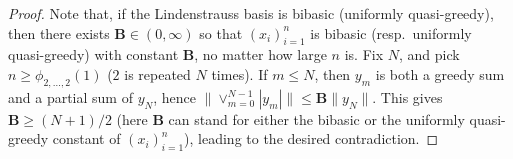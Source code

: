 \documentclass[10pt,a4paper]{amsart}
\begin{document}
\begin{proof}
 Note that, if the Lindenstrauss basis is bibasic (uniformly quasi-greedy), then there exists ${\mathbf{B}} \in (0,\infty)$ so that $(x_i)_{i=1}^n$ is bibasic (resp.~uniformly quasi-greedy) with constant ${\mathbf{B}}$, no matter how large $n$ is.
Fix $N$, and pick $n \geq \phi_{2,\ldots,2}(1)$ ($2$ is repeated $N$ times).
If $m \leq N$, then $y_m$ is both a greedy sum and a partial sum of $y_N$, hence $\| \vee_{m=0}^{N-1} |y_m| \| \leq {\mathbf{B}} \|y_N\|$. This gives ${\mathbf{B}} \geq(N+1)/2$ (here ${\mathbf{B}}$ can stand for either the bibasic or the uniformly quasi-greedy constant of $(x_i)_{i=1}^n$), leading to the desired contradiction.
\end{proof}
\end{document}
